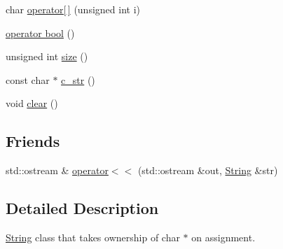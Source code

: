 \begin{DoxyCompactItemize}
\item 
char \hyperlink{classmaudio_1_1String_ab15ae0600e6522c8fbcc845bc9a6d812}{operator\mbox{[}$\,$\mbox{]}} (unsigned int i)
\item 
\hyperlink{classmaudio_1_1String_a081fc720c47f8775acca80ad1ef04ad5}{operator bool} ()
\item 
unsigned int \hyperlink{classmaudio_1_1String_ac53950a268f161a94ce01abd9dd30666}{size} ()
\item 
const char $\ast$ \hyperlink{classmaudio_1_1String_ab781d8eaede62ef0122f886e7e2b8605}{c\-\_\-str} ()
\item 
void \hyperlink{classmaudio_1_1String_a7bc18214ddffee71df5b7d73ea6c57b6}{clear} ()
\end{DoxyCompactItemize}
\subsection*{Friends}
\begin{DoxyCompactItemize}
\item 
std\-::ostream \& \hyperlink{classmaudio_1_1String_aa89c9ffd54d3e1521ae8396d18247d61}{operator$<$$<$} (std\-::ostream \&out, \hyperlink{classmaudio_1_1String}{String} \&str)
\end{DoxyCompactItemize}


\subsection{Detailed Description}
\hyperlink{classmaudio_1_1String}{String} class that takes ownership of char $\ast$ on assignment. 

